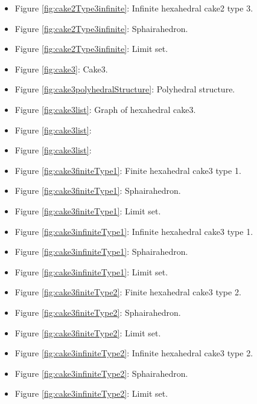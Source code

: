 \documentclass[suppldata, dvipdfmx]{interact}
\theoremstyle{plain}%
\theoremstyle{definition}
\theoremstyle{remark}
\theoremstyle{problemstyle}
\begin{document}
\begin{itemize}
\item Figure \ref{fig:cake2Type3infinite}: Infinite hexahedral cake2
      type 3.
\item Figure
      \ref{fig:cake2Type3infinite}:
      Sphairahedron.
\item Figure
      \ref{fig:cake2Type3infinite}:
      Limit set.

\item Figure \ref{fig:cake3}: Cake3.
\item Figure \ref{fig:cake3polyhedralStructure}: Polyhedral structure.

\item Figure \ref{fig:cake3list}: Graph of hexahedral cake3.
\item Figure \ref{fig:cake3list}:
\item Figure \ref{fig:cake3list}:

\item Figure \ref{fig:cake3finiteType1}: Finite hexahedral cake3 type 1.
\item Figure
      \ref{fig:cake3finiteType1}:
      Sphairahedron.
\item Figure
      \ref{fig:cake3finiteType1}:
      Limit set.

\item Figure \ref{fig:cake3infiniteType1}: Infinite hexahedral cake3
      type 1.
\item Figure
      \ref{fig:cake3infiniteType1}:
      Sphairahedron.
\item Figure
      \ref{fig:cake3infiniteType1}:
      Limit set.

\item Figure \ref{fig:cake3finiteType2}: Finite hexahedral cake3
      type 2.
\item Figure
      \ref{fig:cake3finiteType2}:
      Sphairahedron.
\item Figure
      \ref{fig:cake3finiteType2}: 
      Limit set.

\item Figure \ref{fig:cake3infiniteType2}: Infinite hexahedral cake3
      type 2.
\item Figure
      \ref{fig:cake3infiniteType2}:
      Sphairahedron.
\item Figure
      \ref{fig:cake3infiniteType2}: 
      Limit set.


\end{itemize}
\end{document}
